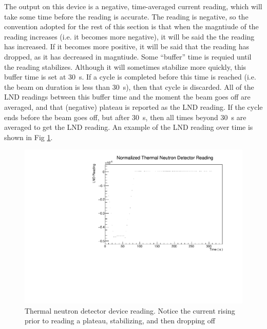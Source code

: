 \documentclass[10pt,letterpaper]{article}
\begin{document}
The output on this device is a negative, time-averaged current reading, which will take some time before the reading is accurate. The reading is negative, so the convention adopted for the rest of this section is that when the magntiude of the reading increases (i.e. it becomes more negative), it will be said the the reading has increased. If it becomes more positive, it will be said that the reading has dropped, as it has decreased in magntiude. Some ``buffer'' time is requied until the reading stabilizes. Although it will sometimes stabilize more quickly, this buffer time is set at \SI{30}{\second}. If a cycle is completed before this time is reached (i.e. the beam on duration is less than \SI{30}{\second}), then that cycle is discarded. All of the LND readings between this buffer time and the moment the beam goes off are averaged, and that (negative) plateau is reported as the LND reading. If the cycle ends before the beam goes off, but after \SI{30}{\second}, then all times beyond \SI{30}{\second} are averaged to get the LND reading. An example of the LND reading over time is shown in Fig \ref{fig:LNDplateau}.

\begin{figure}
\centering
\includegraphics[width=\textwidth,page=1]{../thermal_neutron_detector/lndReadingVsTimeTCN18-042.pdf}
\caption{Thermal neutron detector device reading. Notice the current rising prior to reading a plateau, stabilizing, and then dropping off}
\label{fig:LNDplateau}
\end{figure}
\end{document}
